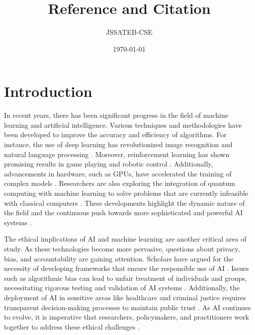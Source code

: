 \documentclass{article}
\title{Reference and Citation}
\author{JSSATEB-CSE}
\date{\today}
\begin{document}
	\maketitle
	
	\section{Introduction}
	In recent years, there has been significant progress in the field of machine learning and artificial intelligence. Various techniques and methodologies have been developed to improve the accuracy and efficiency of algorithms. For instance, the use of deep learning has revolutionized image recognition and natural language processing \cite{lecun2015deep, goodfellow2016deep}. Moreover, reinforcement learning has shown promising results in game playing and robotic control \cite{sutton2018reinforcement, mnih2015human}. Additionally, advancements in hardware, such as GPUs, have accelerated the training of complex models \cite{krizhevsky2012imagenet}. Researchers are also exploring the integration of quantum computing with machine learning to solve problems that are currently infeasible with classical computers \cite{biamonte2017quantum}. These developments highlight the dynamic nature of the field and the continuous push towards more sophisticated and powerful AI systems \cite{russell2016artificial}.
	
	The ethical implications of AI and machine learning are another critical area of study. As these technologies become more pervasive, questions about privacy, bias, and accountability are gaining attention. Scholars have argued for the necessity of developing frameworks that ensure the responsible use of AI \cite{mittelstadt2016ethics, jobin2019global}. Issues such as algorithmic bias can lead to unfair treatment of individuals and groups, necessitating rigorous testing and validation of AI systems \cite{barocas2016big}. Additionally, the deployment of AI in sensitive areas like healthcare and criminal justice requires transparent decision-making processes to maintain public trust \cite{toreini2020relationship}. As AI continues to evolve, it is imperative that researchers, policymakers, and practitioners work together to address these ethical challenges \cite{floridi2018ai}.
	
	\printbibliography
	
\end{document}
